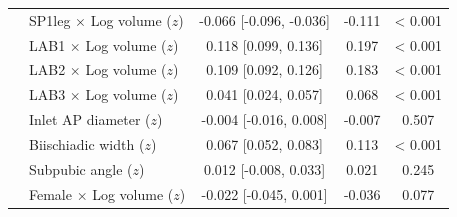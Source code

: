\begin{tabular}{llccc}
 & SP1leg $\times$ Log volume ($z$) & -0.066 [-0.096, -0.036] & -0.111 & < 0.001 \\
 & LAB1 $\times$ Log volume ($z$) & 0.118 [0.099, 0.136] & 0.197 & < 0.001 \\
 & LAB2 $\times$ Log volume ($z$) & 0.109 [0.092, 0.126] & 0.183 & < 0.001 \\
 & LAB3 $\times$ Log volume ($z$) & 0.041 [0.024, 0.057] & 0.068 & < 0.001 \\
 & Inlet AP diameter ($z$) & -0.004 [-0.016, 0.008] & -0.007 & 0.507 \\
 & Biischiadic width ($z$) & 0.067 [0.052, 0.083] & 0.113 & < 0.001 \\
 & Subpubic angle ($z$) & 0.012 [-0.008, 0.033] & 0.021 & 0.245 \\
 & Female $\times$ Log volume ($z$) & -0.022 [-0.045, 0.001] & -0.036 & 0.077 \\
\bottomrule
\end{tabular}
